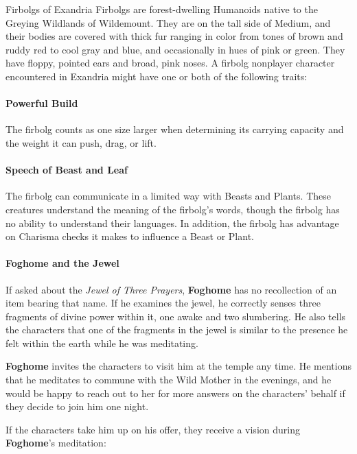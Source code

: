 \documentclass[letterpaper, 11pt, bg=full, twocolumn]{dndbook}
\begin{document}
\begin{DndSidebar}{Firbolgs of Exandria}
Firbolgs are forest-dwelling Humanoids native to the Greying Wildlands of Wildemount. They are on the tall side of Medium, and their bodies are covered with thick fur ranging in color from tones of brown and ruddy red to cool gray and blue, and occasionally in hues of pink or green. They have floppy, pointed ears and broad, pink noses.
A firbolg nonplayer character encountered in Exandria might have one or both of the following traits:
\paragraph{Powerful Build}

The firbolg counts as one size larger when determining its carrying capacity and the weight it can push, drag, or lift.
\paragraph{Speech of Beast and Leaf}

The firbolg can communicate in a limited way with Beasts and Plants. These creatures understand the meaning of the firbolg's words, though the firbolg has no ability to understand their languages. In addition, the firbolg has advantage on Charisma checks it makes to influence a Beast or Plant.
\end{DndSidebar}

\paragraph{Foghome and the Jewel}

If asked about the \textit{Jewel of Three Prayers}, \textbf{Foghome} has no recollection of an item bearing that name. If he examines the jewel, he correctly senses three fragments of divine power within it, one awake and two slumbering. He also tells the characters that one of the fragments in the jewel is similar to the presence he felt within the earth while he was meditating.

\textbf{Foghome} invites the characters to visit him at the temple any time. He mentions that he meditates to commune with the Wild Mother in the evenings, and he would be happy to reach out to her for more answers on the characters' behalf if they decide to join him one night.

If the characters take him up on his offer, they receive a vision during \textbf{Foghome}'s meditation:
\end{document}
